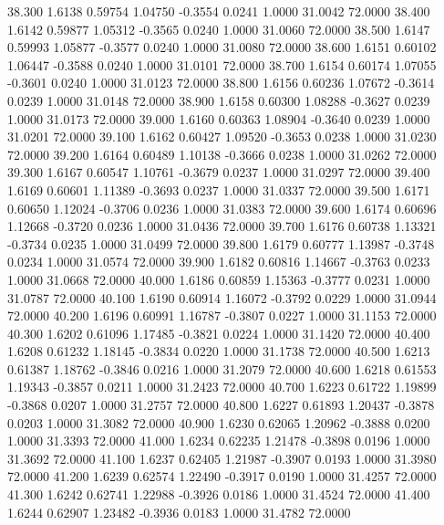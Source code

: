   38.300   1.6138   0.59754   1.04750  -0.3554   0.0241   1.0000  31.0042  72.0000
  38.400   1.6142   0.59877   1.05312  -0.3565   0.0240   1.0000  31.0060  72.0000
  38.500   1.6147   0.59993   1.05877  -0.3577   0.0240   1.0000  31.0080  72.0000
  38.600   1.6151   0.60102   1.06447  -0.3588   0.0240   1.0000  31.0101  72.0000
  38.700   1.6154   0.60174   1.07055  -0.3601   0.0240   1.0000  31.0123  72.0000
  38.800   1.6156   0.60236   1.07672  -0.3614   0.0239   1.0000  31.0148  72.0000
  38.900   1.6158   0.60300   1.08288  -0.3627   0.0239   1.0000  31.0173  72.0000
  39.000   1.6160   0.60363   1.08904  -0.3640   0.0239   1.0000  31.0201  72.0000
  39.100   1.6162   0.60427   1.09520  -0.3653   0.0238   1.0000  31.0230  72.0000
  39.200   1.6164   0.60489   1.10138  -0.3666   0.0238   1.0000  31.0262  72.0000
  39.300   1.6167   0.60547   1.10761  -0.3679   0.0237   1.0000  31.0297  72.0000
  39.400   1.6169   0.60601   1.11389  -0.3693   0.0237   1.0000  31.0337  72.0000
  39.500   1.6171   0.60650   1.12024  -0.3706   0.0236   1.0000  31.0383  72.0000
  39.600   1.6174   0.60696   1.12668  -0.3720   0.0236   1.0000  31.0436  72.0000
  39.700   1.6176   0.60738   1.13321  -0.3734   0.0235   1.0000  31.0499  72.0000
  39.800   1.6179   0.60777   1.13987  -0.3748   0.0234   1.0000  31.0574  72.0000
  39.900   1.6182   0.60816   1.14667  -0.3763   0.0233   1.0000  31.0668  72.0000
  40.000   1.6186   0.60859   1.15363  -0.3777   0.0231   1.0000  31.0787  72.0000
  40.100   1.6190   0.60914   1.16072  -0.3792   0.0229   1.0000  31.0944  72.0000
  40.200   1.6196   0.60991   1.16787  -0.3807   0.0227   1.0000  31.1153  72.0000
  40.300   1.6202   0.61096   1.17485  -0.3821   0.0224   1.0000  31.1420  72.0000
  40.400   1.6208   0.61232   1.18145  -0.3834   0.0220   1.0000  31.1738  72.0000
  40.500   1.6213   0.61387   1.18762  -0.3846   0.0216   1.0000  31.2079  72.0000
  40.600   1.6218   0.61553   1.19343  -0.3857   0.0211   1.0000  31.2423  72.0000
  40.700   1.6223   0.61722   1.19899  -0.3868   0.0207   1.0000  31.2757  72.0000
  40.800   1.6227   0.61893   1.20437  -0.3878   0.0203   1.0000  31.3082  72.0000
  40.900   1.6230   0.62065   1.20962  -0.3888   0.0200   1.0000  31.3393  72.0000
  41.000   1.6234   0.62235   1.21478  -0.3898   0.0196   1.0000  31.3692  72.0000
  41.100   1.6237   0.62405   1.21987  -0.3907   0.0193   1.0000  31.3980  72.0000
  41.200   1.6239   0.62574   1.22490  -0.3917   0.0190   1.0000  31.4257  72.0000
  41.300   1.6242   0.62741   1.22988  -0.3926   0.0186   1.0000  31.4524  72.0000
  41.400   1.6244   0.62907   1.23482  -0.3936   0.0183   1.0000  31.4782  72.0000
